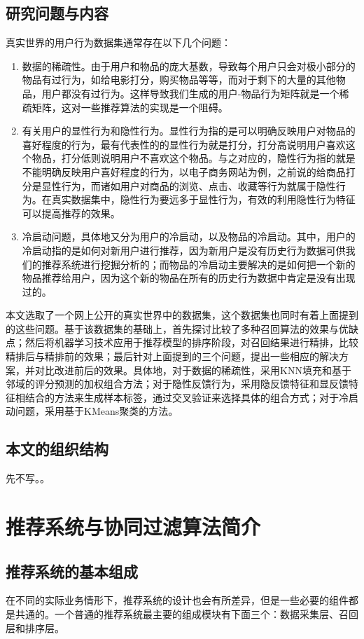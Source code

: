 \documentclass{article}
\begin{document}
	\subsection{研究问题与内容}
	真实世界的用户行为数据集通常存在以下几个问题：
	\begin{enumerate}
	\item 数据的稀疏性。由于用户和物品的庞大基数，导致每个用户只会对极小部分的物品有过行为，如给电影打分，购买物品等等，而对于剩下的大量的其他物品，用户都没有过行为。这样导致我们生成的用户-物品行为矩阵就是一个稀疏矩阵，这对一些推荐算法的实现是一个阻碍。
	\item 有关用户的显性行为和隐性行为。显性行为指的是可以明确反映用户对物品的喜好程度的行为，最有代表性的的显性行为就是打分，打分高说明用户喜欢这个物品，打分低则说明用户不喜欢这个物品。与之对应的，隐性行为指的就是不能明确反映用户喜好程度的行为，以电子商务网站为例，之前说的给商品打分是显性行为，而诸如用户对商品的浏览、点击、收藏等行为就属于隐性行为。在真实数据集中，隐性行为要远多于显性行为，有效的利用隐性行为特征可以提高推荐的效果。
	\item 冷启动问题，具体地又分为用户的冷启动，以及物品的冷启动。其中，用户的冷启动指的是如何对新用户进行推荐，因为新用户是没有历史行为数据可供我们的推荐系统进行挖掘分析的；而物品的冷启动主要解决的是如何把一个新的物品推荐给用户，因为这个新的物品在所有的历史行为数据中肯定是没有出现过的。
	\end{enumerate}

	本文选取了一个网上公开的真实世界中的数据集，这个数据集也同时有着上面提到的这些问题。基于该数据集的基础上，首先探讨比较了多种召回算法的效果与优缺点；然后将机器学习技术应用于推荐模型的排序阶段，对召回结果进行精排，比较精排后与精排前的效果；最后针对上面提到的三个问题，提出一些相应的解决方案，并对比改进前后的效果。具体地，对于数据的稀疏性，采用KNN填充和基于邻域的评分预测的加权组合方法；对于隐性反馈行为，采用隐反馈特征和显反馈特征相结合的方法来生成样本标签，通过交叉验证来选择具体的组合方式；对于冷启动问题，采用基于KMeans聚类的方法。

	\subsection{本文的组织结构}
	先不写。。

\section{推荐系统与协同过滤算法简介}
	\subsection{推荐系统的基本组成}
	在不同的实际业务情形下，推荐系统的设计也会有所差异，但是一些必要的组件都是共通的。一个普通的推荐系统最主要的组成模块有下面三个：数据采集层、召回层和排序层。
\end{document}
